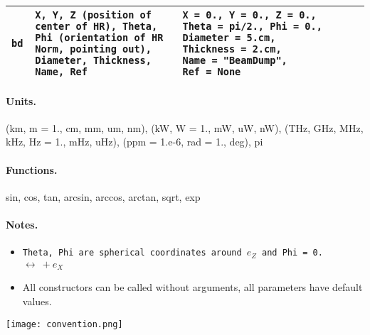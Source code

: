 \documentclass[a4paper, landscape]{article}
\begin{document}
\begin{tabular}{| p{.6cm} | p{7cm}| p{6cm} | p{5cm} |}
\tt{bd} & \tt{X}, \tt{Y}, \tt{Z} (position of center of HR), \tt{Theta}, \tt{Phi} (orientation of HR Norm, pointing out), \tt{Diameter},  \tt{Thickness}, \tt{Name}, \tt{Ref} & \tt{X}~=~0., \tt{Y}~=~0., \tt{Z}~=~0., \tt{Theta}~=~pi/2., \tt{Phi}~=~0., \tt{Diameter}~=~5.cm,  \tt{Thickness}~=~2.cm, \tt{Name}~=~"BeamDump", \tt{Ref}~=~None & \\ \hline

\end{tabular}

\begin{multicols}{2}

\paragraph{Units.}(km, m = 1., cm, mm, um, nm), (kW, W = 1., mW, uW, nW), (THz, GHz, MHz, kHz, Hz = 1., mHz, uHz), (ppm = 1.e-6, rad = 1., deg), pi
\paragraph{Functions.} sin, cos, tan, arcsin, arccos, arctan, sqrt, exp

\paragraph{Notes.}\begin{itemize}
\item \tt{Theta}, \tt{Phi} are spherical coordinates around $e_Z$ and \tt{Phi = 0.} $\leftrightarrow~ + e_X$ 
\item All constructors can be called without arguments, all parameters have default values.
\end{itemize}
\texttt{[image: convention.png]}
\end{multicols}
\end{document}

